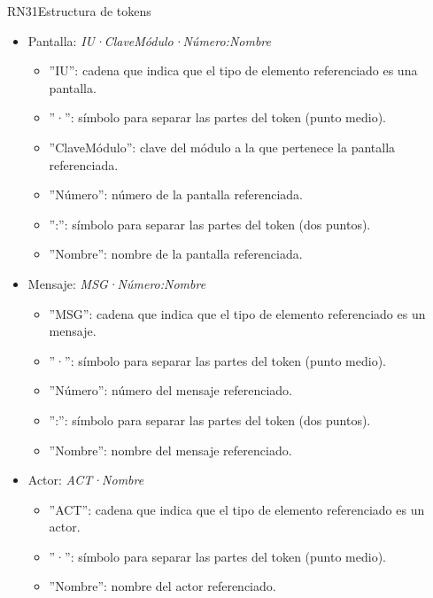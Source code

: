 \begin{BussinesRule}{RN31}{Estructura de tokens}
\begin{itemize}
\begin{itemize}
			\item ''ClaveMódulo'': clave del módulo a la que pertenece el caso de uso referenciado.
			\item ''Número'': número del caso de uso referenciado.
			\item '':'': símbolo para separar las partes del token (dos puntos).
			\item ''Nombre'': nombre del caso de uso referenciado.
		\end{itemize}
		\item Pantalla: {\em IU·ClaveMódulo·Número:Nombre}
		\begin{itemize}
			\item ''IU'': cadena que indica que el tipo de elemento referenciado es una pantalla.
			\item ''·'': símbolo para separar las partes del token (punto medio).
			\item ''ClaveMódulo'': clave del módulo a la que pertenece la pantalla referenciada.
			\item ''Número'': número de la pantalla referenciada.
			\item '':'': símbolo para separar las partes del token (dos puntos).
			\item ''Nombre'': nombre de la pantalla referenciada.
		\end{itemize}
		\item Mensaje: {\em MSG·Número:Nombre}
		\begin{itemize}
			\item ''MSG'': cadena que indica que el tipo de elemento referenciado es un mensaje.
			\item ''·'':  símbolo para separar las partes del token (punto medio).
			\item ''Número'': número del mensaje referenciado.
			\item '':'': símbolo para separar las partes del token (dos puntos).
			\item ''Nombre'': nombre del mensaje referenciado.
		\end{itemize}
	\item Actor: {\em ACT·Nombre}
		\begin{itemize}
			\item ''ACT'': cadena que indica que el tipo de elemento referenciado es un actor.
			\item ''·'':  símbolo para separar las partes del token (punto medio).
			\item ''Nombre'': nombre del actor referenciado.
		\end{itemize}

\end{itemize}
\end{BussinesRule}
